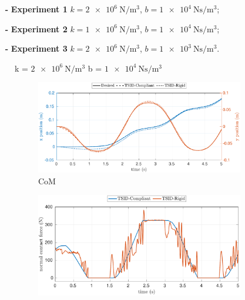 \begin{itemize}
    \item[\textbf{-}]\textbf{Experiment 1} $k=\SI{2e6}{\newton \per \meter^3}$, $b = \SI{1e4}{\newton \second \per \meter^3}$;
    \item[\textbf{-}]\textbf{Experiment 2} $k=\SI{1e6}{\newton \per \meter^3}$, $b=\SI{1e4}{\newton \second \per \meter^3}$;
    \item[\textbf{-}]\textbf{Experiment 3} $k = \SI{2e6}{\newton \per \meter^3}$, $b=\SI{1e3}{\newton \second \per \meter^3}$.
\end{itemize}


\begin{figure}[t]
    \begin{myframe}{k = $\SI{2e6}{\newton \per \meter^3}$  b = $\SI{1e4}{\newton \second \per \meter^3}$}
    \centering
        \begin{subfigure}[b]{0.49\textwidth}
        \centering
        \includegraphics[height=0.151\textheight]{chapter_compliant_contact/figures/compliant_2e6_1e4_stiff_2e6_1e4_com.pdf}
        \caption{CoM}
        \label{fig:2e6_1e4_com}
    \end{subfigure}
    \hfill
    \begin{subfigure}[b]{0.49\textwidth}
        \centering
        \includegraphics[height=0.151\textheight]{chapter_compliant_contact/figures/compliant_2e6_1e4_stiff_2e6_1e4_force.pdf}

\end{subfigure}
\end{myframe}
\end{figure}

